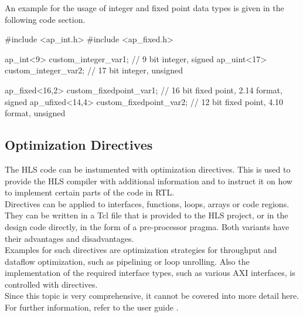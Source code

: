 An example for the usage of integer and fixed point data types is given in the following code section.

\begin{CppCode}
  #include <ap_int.h>
  #include <ap_fixed.h>

  ap_int<9>   custom_integer_var1;         //  9 bit integer, signed
  ap_uint<17> custom_integer_var2;         // 17 bit integer, unsigned

  ap_fixed<16,2>  custom_fixedpoint_var1;  // 16 bit fixed point, 2.14 format, signed
  ap_ufixed<14,4> custom_fixedpoint_var2;  // 12 bit fixed point, 4.10 format, unsigned
\end{CppCode}

\subsection{Optimization Directives}

The HLS code can be instumented with optimization directives.
This is used to provide the HLS compiler with additional information and to instruct it on how to implement certain parts of the code in RTL.\\

Directives can be applied to interfaces, functions, loops, arrays or code regions.
They can be written in a Tcl file that is provided to the HLS project, or in the design code directly, in the form of a pre-processor pragma.
Both variants have their advantages and disadvantages.\\

Examples for such directives are optimization strategies for throughput and dataflow optimization, such as pipelining or loop unrolling.
Also the implementation of the required interface types, such as various AXI interfaces, is controlled with directives.\\

Since this topic is very comprehensive, it cannot be covered into more detail here.
For further information, refer to the user guide \cite{VivadoUgHLS}.


